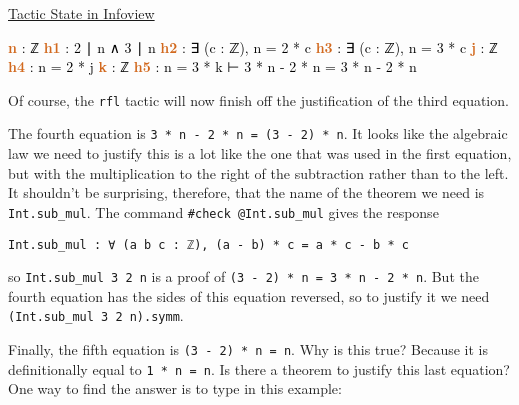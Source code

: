 \documentclass[
  letterpaper,
  DIV=11,
  numbers=noendperiod]{scrreprt}
\newenvironment{Shaded}{\begin{snugshade}}{\end{snugshade}}
\newcommand{\InformationTok}[1]{\textcolor[rgb]{0.37,0.37,0.37}{#1}}
\newcommand{\NormalTok}[1]{\textcolor[rgb]{0.00,0.23,0.31}{#1}}
\newcommand{\SpecialCharTok}[1]{\textcolor[rgb]{0.37,0.37,0.37}{#1}}
\renewcommand{\NormalTok}[1]{\textcolor[HTML]{000000}{#1}}
\renewcommand{\SpecialCharTok}[1]{}
\renewcommand{\InformationTok}[1]{\textcolor[HTML]{D2691E}{\textbf{#1}}}
\newenvironment{ind}
	{\begin{list}{}{\setlength{\leftmargin}{1em}}\item\relax}
	{\end{list}}
\newcommand{\nobreakShaded}{\renewenvironment{Shaded}
	{\begin{tcolorbox}[frame hidden, enhanced, interior hidden, boxrule=0pt,
		borderline west={3pt}{0pt}{shadecolor}, sharp corners]}
	{\end{tcolorbox}}}
\newenvironment{outpt}
	{\nobreakShaded\begin{minipage}[t]{0.32\textwidth}
		\uline{Tactic State in Infoview}}
	{\end{minipage}}
\theoremstyle{remark}
\begin{document}
\begin{outpt}

\begin{Shaded}
\begin{Highlighting}[]
\InformationTok{n }\NormalTok{: ℤ}
\InformationTok{h1 }\NormalTok{: 2 ∣ n ∧ 3 ∣ n}
\InformationTok{h2 }\NormalTok{: ∃ (c : ℤ),}
\SpecialCharTok{\textgreater{}\textgreater{}}\NormalTok{  n = 2 * c}
\InformationTok{h3 }\NormalTok{: ∃ (c : ℤ),}
\SpecialCharTok{\textgreater{}\textgreater{}}\NormalTok{  n = 3 * c}
\InformationTok{j }\NormalTok{: ℤ}
\InformationTok{h4 }\NormalTok{: n = 2 * j}
\InformationTok{k }\NormalTok{: ℤ}
\InformationTok{h5 }\NormalTok{: n = 3 * k}
\NormalTok{⊢ 3 * n {-} 2 * n =}
\SpecialCharTok{\textgreater{}\textgreater{}}\NormalTok{  3 * n {-} 2 * n}
\end{Highlighting}
\end{Shaded}

\end{outpt}

Of course, the \texttt{rfl} tactic will now finish off the justification
of the third equation.

The fourth equation is \texttt{3\ *\ n\ -\ 2\ *\ n\ =\ (3\ -\ 2)\ *\ n}.
It looks like the algebraic law we need to justify this is a lot like
the one that was used in the first equation, but with the multiplication
to the right of the subtraction rather than to the left. It shouldn't be
surprising, therefore, that the name of the theorem we need is
\texttt{Int.sub\_mul}. The command \texttt{\#check\ @Int.sub\_mul} gives
the response

\begin{ind}

\begin{verbatim}
Int.sub_mul : ∀ (a b c : ℤ), (a - b) * c = a * c - b * c
\end{verbatim}

\end{ind}

so \texttt{Int.sub\_mul\ 3\ 2\ n} is a proof of
\texttt{(3\ -\ 2)\ *\ n\ =\ 3\ *\ n\ -\ 2\ *\ n}. But the fourth
equation has the sides of this equation reversed, so to justify it we
need \texttt{(Int.sub\_mul\ 3\ 2\ n).symm}.

Finally, the fifth equation is \texttt{(3\ -\ 2)\ *\ n\ =\ n}. Why is
this true? Because it is definitionally equal to \texttt{1\ *\ n\ =\ n}.
Is there a theorem to justify this last equation? One way to find the
answer is to type in this example:
\end{document}
